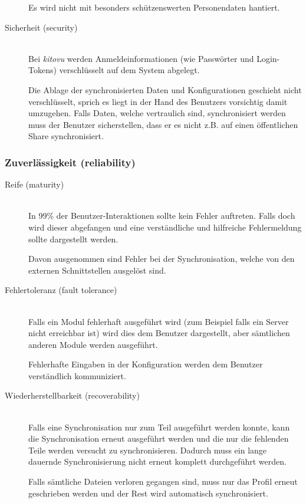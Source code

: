 \documentclass[a4paper]{article}
\begin{document}
\begin{description}
    Es wird nicht mit besonders schützenswerten Personendaten hantiert.
  \item[Sicherheit (security)] \strut \\
    Bei \emph{kitovu} werden Anmeldeinformationen (wie Passwörter und Login-Tokens) verschlüsselt auf dem System abgelegt.

    Die Ablage der synchronisierten Daten und Konfigurationen geschieht nicht verschlüsselt, sprich es liegt in der Hand des Benutzers vorsichtig damit umzugehen.
    Falls Daten, welche vertraulich sind, synchronisiert werden muss der Benutzer sicherstellen, dass er es nicht z.B. auf einen öffentlichen Share synchronisiert.
\end{description}

\subsubsection{Zuverlässigkeit (reliability)}

\begin{description}
  \item[Reife (maturity)] \strut \\
    In 99\% der Benutzer-Interaktionen sollte kein Fehler auftreten.
    Falls doch wird dieser abgefangen und eine verständliche und hilfreiche Fehlermeldung sollte dargestellt werden.

    Davon ausgenommen sind Fehler bei der Synchronisation, welche von den externen Schnittstellen ausgelöst sind.
  \item[Fehlertoleranz (fault tolerance)] \strut \\
    Falls ein Modul fehlerhaft ausgeführt wird (zum Beispiel falls ein Server nicht erreichbar ist) wird dies dem Benutzer dargestellt, aber sämtlichen anderen Module werden ausgeführt.

    Fehlerhafte Eingaben in der Konfiguration werden dem Benutzer verständlich kommuniziert.
  \item[Wiederherstellbarkeit (recoverability)] \strut \\
    Falls eine Synchronisation nur zum Teil ausgeführt werden konnte, kann die Synchronisation erneut ausgeführt werden und die nur die fehlenden Teile werden versucht zu synchronisieren.
    Dadurch muss ein lange dauernde Synchronisierung nicht erneut komplett durchgeführt werden.

    Falls sämtliche Dateien verloren gegangen sind, muss nur das Profil erneut geschrieben werden und der Rest wird automatisch synchronisiert.
\end{description}
\end{document}

